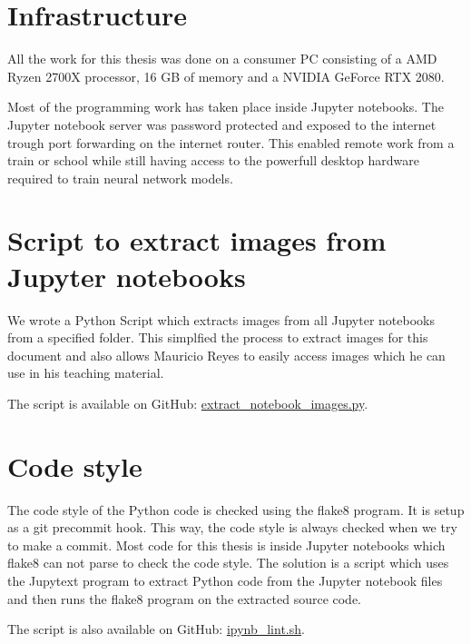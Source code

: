 \label{chapter_infrastructure}
\section{Infrastructure}
All the work for this thesis was done on a consumer PC consisting of a AMD Ryzen 2700X processor, 16 GB of memory and a NVIDIA GeForce RTX 2080.

Most of the programming work has taken place inside Jupyter notebooks. The Jupyter notebook server was password protected and exposed to the internet trough port forwarding on the internet router. This enabled remote work from a train or school while still having access to the powerfull desktop hardware required to train neural network models.

\section{Script to extract images from Jupyter notebooks}

We wrote a Python Script which extracts images from all Jupyter notebooks from a specified folder. This simplfied the process to extract images for this document and also allows Mauricio Reyes to easily access images which he can use in his teaching material.

The script is available on GitHub: \href{https://github.com/andef4/thesis-code/blob/master/extract_notebook_images.py}{extract\_notebook\_images.py}.

\section{Code style}
The code style of the Python code is checked using the flake8 program. It is setup as a git precommit hook. This way, the code style is always checked when we try to make a commit. Most code for this thesis is inside Jupyter notebooks which flake8 can not parse to check the code style. The solution is a script which uses the Jupytext \cite{jupytext} program to extract Python code from the Jupyter notebook files and then runs the flake8 program on the extracted source code.

The script is also available on GitHub: \href{https://github.com/andef4/thesis-code/blob/master/ipynb_lint.sh}{ipynb\_lint.sh}.
